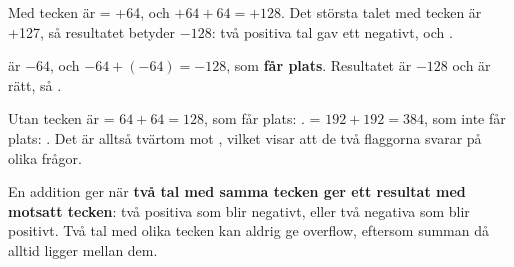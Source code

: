 Med tecken är  = +64, och $+64 + 64 = +128$. Det största talet med tecken är +127,
så resultatet  betyder $-128$: två positiva tal gav ett negativt, och
\textbf{}.

 är $-64$, och $-64 + (-64) = -128$, som \textbf{får plats}. Resultatet  är
$-128$ och är rätt, så \textbf{}.

Utan tecken är  = $64 + 64 = 128$, som får plats: .
 = $192 + 192 = 384$, som inte får plats: . Det är alltså tvärtom mot
, vilket visar att de två flaggorna svarar på olika frågor.

En addition ger  när \textbf{två tal med samma tecken ger ett resultat med
motsatt tecken}: två positiva som blir negativt, eller två negativa som blir positivt. Två tal med
olika tecken kan aldrig ge overflow, eftersom summan då alltid ligger mellan dem.
